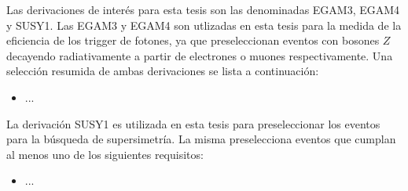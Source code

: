 Las derivaciones de interés para esta tesis son las denominadas EGAM3, EGAM4 y SUSY1. Las EGAM3 y EGAM4 son utlizadas en esta tesis para la medida de la eficiencia de los trigger de fotones, ya que preseleccionan eventos con bosones $Z$ decayendo radiativamente a partir de electrones o muones respectivamente. Una selección resumida de ambas derivaciones se lista a continuación:


\begin{itemize}
  \item ...
\end{itemize}




La derivación SUSY1 es utilizada en esta tesis para preseleccionar los eventos para la búsqueda de supersimetría. La misma preselecciona eventos que cumplan al menos uno de los siguientes requisitos:

\begin{itemize}
  \item ...
\end{itemize}
